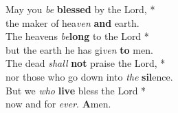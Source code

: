 May you \emph{be} \textbf{blessed} by the Lord, *\\
the maker of hea\emph{ven} \textbf{and} earth.\\
The heavens \emph{be}\textbf{long} to the Lord *\\
but the earth he has gi\emph{ven} \textbf{to} men.\\

The dead \emph{shall} \textbf{not} praise the Lord, *\\
nor those who go down into \emph{the} \textbf{sil}ence.\\
But we \emph{who} \textbf{live} bless the Lord *\\
now and for \emph{ever}. \textbf{A}men.

